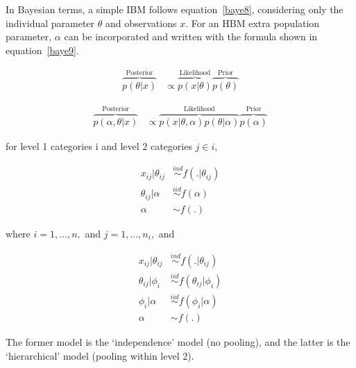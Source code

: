 In Bayesian terms, a simple IBM follows equation~\ref{baye8}, considering only the individual parameter $\theta$ and observations $x$. For an HBM extra population parameter, $\alpha$ can be incorporated and written with the formula shown in equation~\ref{baye9}. 

\begin{equation}\label{baye8}
\begin{aligned}
\overbrace {p(\theta|x)}^{\text{Posterior}} & \propto \overbrace {p(x|\theta)}^{\text{Likelihood}} \overbrace {p(\theta)}^{\text{Prior}} 
\end{aligned}
\end{equation}

\begin{equation}\label{baye9}
\begin{aligned}
\overbrace {p(\alpha,\theta|x)}^{\text{Posterior}} & \propto \overbrace {p(x|\theta,\alpha)p(\theta|\alpha)}^{\text{Likelihood}} \overbrace {p(\alpha)}^{\text{Prior}}
\end{aligned}
\end{equation}

\newpara

for level 1 categories i and level 2 categories $j \in i$, 

\begin{equation}\label{baye9}
\begin{aligned}
x_{ij}|\theta_{ij}&\overset{ind}{\sim}f(.|\theta_{ij})\\
\theta_{ij}|\alpha&\overset{iid}{\sim}f(\alpha)\\
\alpha&\sim f(.)
\end{aligned}
\end{equation}

where $i = 1,...,n,$ and $j = 1,...,n_i,$ and

\begin{equation}\label{baye9}
\begin{aligned}
x_{ij}|\theta_{ij}&\overset{ind}{\sim}f(.|\theta_{ij})\\
\theta_{ij}|\phi_i&\overset{iid}{\sim}f(\theta_{ij}|\phi_i)\\
\phi_i|\alpha&\overset{iid}{\sim}f(\phi_i|\alpha)\\
\alpha&\sim f(.)
\end{aligned}
\end{equation}

The former model is the ‘independence’ model (no pooling), and the latter is the ‘hierarchical’ model (pooling within level 2). 

